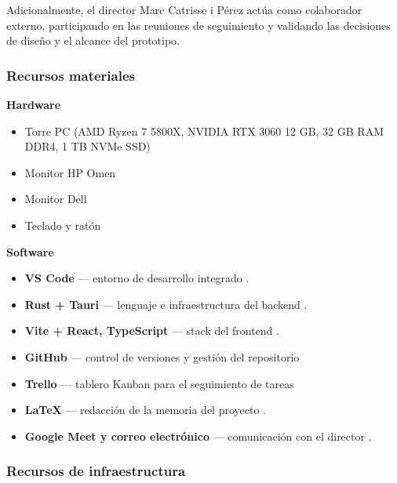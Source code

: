 \documentclass{article}
\begin{document}
{        \justify
        Adicionalmente, el director Marc Catrisse i Pérez actúa como colaborador externo,
        participando en las reuniones de seguimiento y validando las decisiones de diseño 
        y el alcance del prototipo.

        \subsubsection{Recursos materiales}

        \textbf{Hardware}

        \begin{itemize}[leftmargin=*, itemsep=1pt]
        \item Torre PC (AMD Ryzen 7 5800X, NVIDIA RTX 3060 12 GB, 32 GB RAM DDR4, 1 TB NVMe SSD)
        \item Monitor HP Omen
        \item Monitor Dell
        \item Teclado y ratón
        \end{itemize}

        \textbf{Software}

        \begin{itemize}[leftmargin=*, itemsep=1pt]
        \item \textbf{VS Code} — entorno de desarrollo integrado \cite{noauthor_visual_nodate}.
        \item \textbf{Rust + Tauri} — lenguaje e infraestructura del backend \cite{noauthor_rust_nodate} \cite{noauthor_que_2025-1}.
        \item \textbf{Vite + React, TypeScript} — stack del frontend \cite{noauthor_getting_nodate} \cite{noauthor_react_nodate} \cite{noauthor_javascript_nodate}.
        \item \textbf{GitHub} — control de versiones y gestión del repositorio
        \item \textbf{Trello} — tablero Kanban para el seguimiento de tareas
        \item \textbf{\LaTeX{}} — redacción de la memoria del proyecto \cite{noauthor_latex_nodate}.
        \item \textbf{Google Meet y correo electrónico} — comunicación con el director \cite{noauthor_google_nodate}.
        \end{itemize}

        \subsubsection{Recursos de infraestructura}

}
\end{document}
